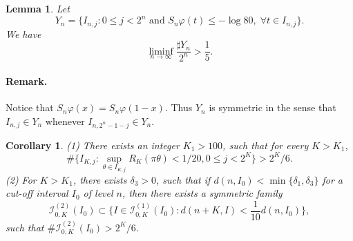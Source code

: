 \documentclass[10pt,a4paper]{amsart}
\newtheorem{lemm}{Lemma}
\newtheorem{cor}{Corollary}
\begin{document}
\begin{lemm}\label{discrete}
Let
$$Y_n=\{I_{n,j} : 0\le j<2^n \mbox{ and } S_n \varphi(t)\le-\log 80,\; \forall t\in I_{n,j} \}.$$
We have
$$\liminf_{n\to\infty}\frac{\sharp Y_n}{2^n}>\frac{1}{5}.$$
\end{lemm}
\paragraph{\textbf{Remark.}} Notice that $S_n\varphi(x)=S_n\varphi(1-x)$. 
Thus $Y_n$ is symmetric in the sense that
 $I_{n,j}\in Y_n$ whenever $I_{n,2^n-1-j}\in Y_n$. 

 \begin{cor}
\label{1924}
(1) There exists an integer $K_1>100$, such that for every $K>K_1$, 
\begin{equation}
\label{1/20}
\#\{I_{K,j}:\sup_{\theta\in I_{K,j}}R_K(\pi\theta)<1/20, 0\le j<2^K\}>2^K/6.
\end{equation}
(2) For $K>K_1$, there exists $\delta_3>0$, such that if $d(n,I_0)<\min\{\delta_1,\delta_3\}$
for a cut-off interval $I_0$ of level $n$, then there exists a symmetric family
\begin{equation*}
\mathcal{I}_{0,K}^{(2)}(I_0)\subset\{I\in\mathcal{I}_{0,K}^{(1)}(I_0):
d(n+K,I)<\frac{1}{10}d(n,I_0)\},
\end{equation*}
such that $\#\mathcal{I}_{0,K}^{(2)}(I_0)>2^K/6$.
\end{cor}
\end{document}
